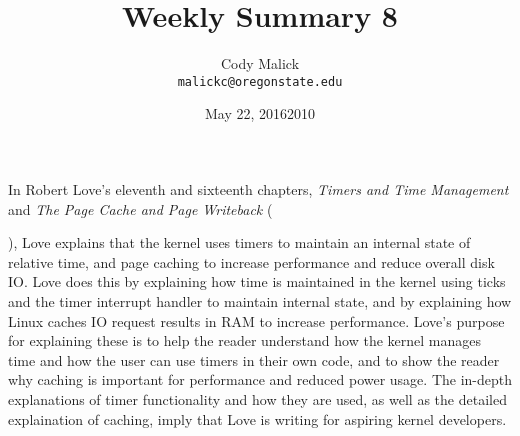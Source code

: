 \documentclass[10pt,letterpaper]{article}
\begin{document}
  \title{Weekly Summary 8}
  \author{Cody Malick\\
  \texttt{malickc@oregonstate.edu}}
  \date{May 22, 2016}
  \maketitle

    In Robert Love's eleventh and sixteenth chapters, \textit{Timers and Time Management}
    and \textit{The Page Cache and Page Writeback} (\date{2010}), Love explains
    that the kernel uses timers to maintain an internal state of relative time, and
    page caching to increase performance and reduce overall disk IO. 
    Love does this by explaining how time is maintained in the kernel using
    ticks and the timer interrupt handler to maintain internal state, and by
    explaining how Linux caches IO request results in RAM to increase performance.
    Love's purpose for explaining these is to help the reader understand how
    the kernel manages time and how the user can use timers in their own code,
    and to show the reader why caching is important for performance and reduced
    power usage. The in-depth explanations of timer functionality and how they
    are used, as well as the detailed explaination of caching, imply that Love
    is writing for aspiring kernel developers.
\end{document}
